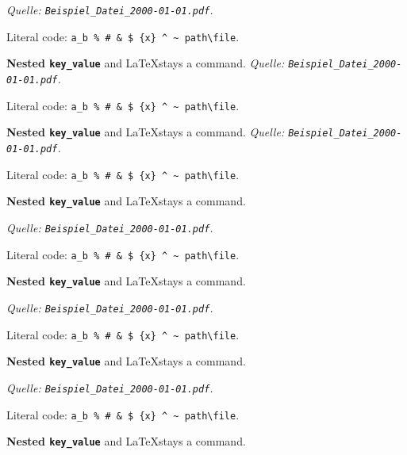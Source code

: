 \emph{Quelle: \texttt{Beispiel\_Datei\_2000-01-01.pdf}.}

Literal code: \texttt{a\_b \% \# \& \$ \{x\} \textasciicircum{} \textasciitilde{} path\textbackslash{}file}.

\textbf{Nested \texttt{key\_value}} and \LaTeX stays a command.
\emph{Quelle: \texttt{Beispiel\_Datei\_2000-01-01.pdf}.}

Literal code: \texttt{a\_b \% \# \& \$ \{x\} \textasciicircum{} \textasciitilde{} path\textbackslash{}file}.

\textbf{Nested \texttt{key\_value}} and \LaTeX stays a command.
\emph{Quelle: \texttt{Beispiel\_Datei\_2000-01-01.pdf}.}

Literal code: \texttt{a\_b \% \# \& \$ \{x\} \textasciicircum{} \textasciitilde{} path\textbackslash{}file}.

\textbf{Nested \texttt{key\_value}} and \LaTeX stays a command.
\begin{frame}[t]
\emph{Quelle: \texttt{Beispiel\_Datei\_2000-01-01.pdf}.}

Literal code: \texttt{a\_b \% \# \& \$ \{x\} \textasciicircum{} \textasciitilde{} path\textbackslash{}file}.

\textbf{Nested \texttt{key\_value}} and \LaTeX stays a command.
\end{frame}

\begin{frame}[t]
\emph{Quelle: \texttt{Beispiel\_Datei\_2000-01-01.pdf}.}

Literal code: \texttt{a\_b \% \# \& \$ \{x\} \textasciicircum{} \textasciitilde{} path\textbackslash{}file}.

\textbf{Nested \texttt{key\_value}} and \LaTeX stays a command.
\end{frame}

\begin{frame}[t]
\emph{Quelle: \texttt{Beispiel\_Datei\_2000-01-01.pdf}.}

Literal code: \texttt{a\_b \% \# \& \$ \{x\} \textasciicircum{} \textasciitilde{} path\textbackslash{}file}.

\textbf{Nested \texttt{key\_value}} and \LaTeX stays a command.
\end{frame}

